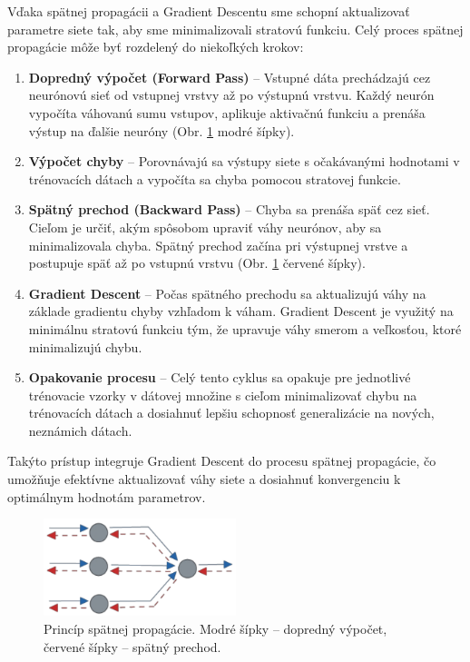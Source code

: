 Vďaka spätnej propagácii a Gradient Descentu sme schopní aktualizovať parametre siete tak, aby sme minimalizovali stratovú funkciu. Celý proces spätnej propagácie môže byť rozdelený do niekoľkých krokov:

\begin{enumerate}
\item \textbf{Dopredný výpočet (Forward Pass)} – Vstupné dáta prechádzajú cez neurónovú sieť od vstupnej vrstvy až po výstupnú vrstvu. Každý neurón vypočíta váhovanú sumu vstupov, aplikuje aktivačnú funkciu a prenáša výstup na ďalšie neuróny (Obr. \ref{fig:backpropagation} modré šípky).
\item \textbf{Výpočet chyby} – Porovnávajú sa výstupy siete s očakávanými hodnotami v trénovacích dátach a vypočíta sa chyba pomocou stratovej funkcie.
\item \textbf{Spätný prechod (Backward Pass)} – Chyba sa prenáša späť cez sieť. Cieľom je určiť, akým spôsobom upraviť váhy neurónov, aby sa minimalizovala chyba. Spätný prechod začína pri výstupnej vrstve a postupuje späť až po vstupnú vrstvu (Obr. \ref{fig:backpropagation} červené šípky).
\item \textbf{Gradient Descent} – Počas spätného prechodu sa aktualizujú váhy na základe gradientu chyby vzhľadom k váham. Gradient Descent je využitý na minimálnu stratovú funkciu tým, že upravuje váhy smerom a veľkosťou, ktoré minimalizujú chybu.
\item \textbf{Opakovanie procesu} – Celý tento cyklus sa opakuje pre jednotlivé trénovacie vzorky v dátovej množine s cieľom minimalizovať chybu na trénovacích dátach a dosiahnuť lepšiu schopnosť generalizácie na nových, neznámich dátach.
\end{enumerate}

Takýto prístup integruje Gradient Descent do procesu spätnej propagácie, čo umožňuje efektívne aktualizovať váhy siete a dosiahnuť konvergenciu k optimálnym hodnotám parametrov.

\begin{figure}[H]
\centerline{\includegraphics[width=0.5\textwidth]{images/forward_back.png}}
\caption{Princíp spätnej propagácie. Modré šípky – dopredný výpočet, červené šípky – spätný prechod.}
\label{fig:backpropagation}
\end{figure}

